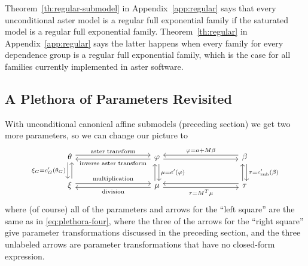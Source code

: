 Theorem~\ref{th:regular-submodel} in Appendix~\ref{app:regular} says
that every unconditional aster model is a regular full exponential family
if the saturated model is a regular full exponential family.
Theorem~\ref{th:regular} in Appendix~\ref{app:regular} says the latter
happens when every family for every dependence group is a regular full
exponential family, which is the case for all families currently implemented
in aster software.

\subsection{A Plethora of Parameters Revisited}
\label{sec:revisited}

With unconditional canonical affine submodels (preceding section) we get
two more parameters, so we can change our picture to
\begin{equation} \label{eq:plethora-six}
\begin{tikzcd}[column sep=9em]
   \theta
   \arrow[r, "\text{aster transform}", shift left]
   \arrow[d, "\xi_G = c_G'(\theta_G)"', shift right]
   &
   \varphi
   \arrow[l, "\text{inverse aster transform}", shift left]
   \arrow[d, "\mu = c'(\varphi)", shift left]
   \arrow[r, shift right]
   &
   \beta
   \arrow[l, "\varphi = a + M \beta"', shift right]
   \arrow[d, "\tau = c_\text{sub}'(\beta)", shift left]
   \\
   \xi
   \arrow[u, shift right]
   \arrow[r, "\text{multiplication}", shift left]
   &
   \mu
   \arrow[l, "\text{division}", shift left]
   \arrow[u, shift left]
   \arrow[r, "\tau = M^T \mu"', shift right]
   &
   \tau
   \arrow[l, shift right]
   \arrow[u, shift left]
\end{tikzcd}
\end{equation}
where (of course) all of the parameters and arrows for the ``left square''
are the same as in \eqref{eq:plethora-four}, where the three of the arrows
for the ``right square'' give parameter transformations discussed in the
preceding section, and the three unlabeled arrows are parameter transformations
that have no closed-form expression.


